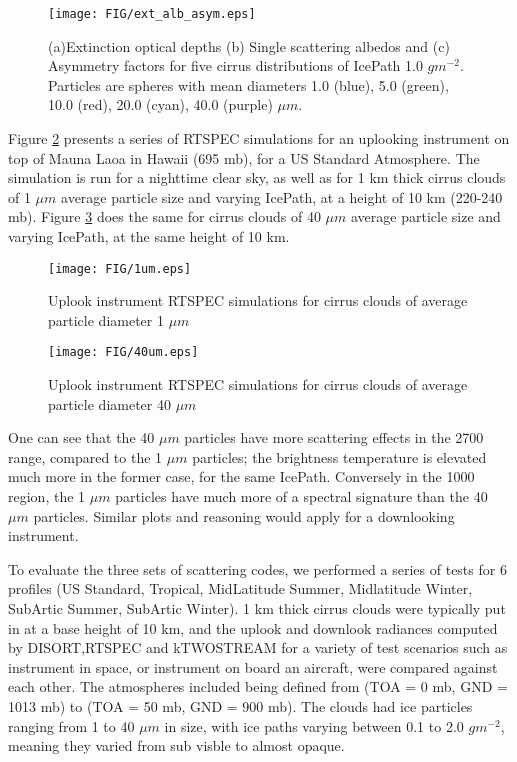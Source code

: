 \documentclass[11pt]{article}
\begin{document}
\begin{figure}
\texttt{[image: FIG/ext\_alb\_asym.eps]}
\caption{(a)Extinction optical depths (b) Single scattering albedos and 
(c) Asymmetry factors for five cirrus distributions of IcePath
1.0 $g m^{-2}$. Particles are spheres with mean diameters 1.0 (blue), 
5.0 (green), 10.0 (red), 20.0 (cyan), 40.0 (purple) $\mu m$.}
\label{fig:ext_alb_asy}
\end{figure}

Figure \ref{fig:uplook1} presents a series of \textsf{RTSPEC} simulations 
for an uplooking instrument on top of Mauna Laoa in Hawaii (695 mb), for a US 
Standard Atmosphere. The simulation is run for a nighttime clear sky, as well 
as for 1 km thick cirrus clouds of 1 $\mu m$ average particle size and 
varying IcePath, at a height of 10 km (220-240 mb). 
Figure \ref{fig:uplook40} does the same for cirrus clouds of 40 $\mu m$ 
average particle size and varying IcePath, at the same height of 10 km.

\begin{figure}
\texttt{[image: FIG/1um.eps]}
\caption{Uplook instrument \textsf{RTSPEC} simulations for cirrus clouds of
average particle diameter 1 $\mu m$}
\label{fig:uplook1}
\end{figure}

\begin{figure}
\texttt{[image: FIG/40um.eps]}
\caption{Uplook instrument \textsf{RTSPEC} simulations for cirrus clouds of
average particle diameter 40 $\mu m$}
\label{fig:uplook40}
\end{figure}

One can see that the 40 $\mu m$ particles have more scattering effects in the
2700 \wn range, compared to the 1 $\mu m$ particles; the brightness 
temperature is elevated much more in the former case, for the same IcePath. 
Conversely in the 1000 \wn region, the 1 $\mu m$ particles have much more of 
a spectral signature than the 40 $\mu m$ particles. Similar plots and 
reasoning would apply for a downlooking instrument.

To evaluate the three sets of scattering codes, we performed a series of tests
for 6 profiles (US Standard, Tropical, MidLatitude Summer, Midlatitude Winter,
SubArtic Summer, SubArtic Winter). 1 km thick cirrus clouds were typically put
in at a base height of 10 km, and the uplook and downlook radiances computed 
by \textsf{DISORT},\textsf{RTSPEC} and \textsf{kTWOSTREAM} for a variety of 
test scenarios such as instrument in space, or instrument on board an 
aircraft, were compared against each other. The atmospheres included being 
defined from (TOA = 0 mb, GND = 1013 mb) to (TOA = 50 mb, GND = 900 mb). The 
clouds had ice particles ranging from 1 to 40 $\mu m$ in size, with ice paths 
varying between 0.1 to 2.0 $g m^{-2}$, meaning they varied from sub visble to
almost opaque. 
\end{document}

